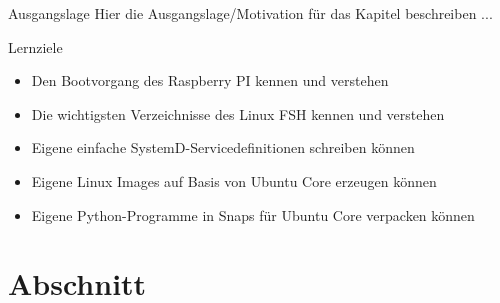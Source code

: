 \begin{frame}{Ausgangslage}
    Hier die Ausgangslage/Motivation für das Kapitel beschreiben ...

\end{frame}

\begin{frame}{Lernziele}
    \begin{itemize}
        \item Den Bootvorgang des Raspberry PI kennen und verstehen
        \item Die wichtigsten Verzeichnisse des Linux FSH kennen und verstehen
        \item Eigene einfache SystemD-Servicedefinitionen schreiben können
        \item Eigene Linux Images auf Basis von Ubuntu Core erzeugen können
        \item Eigene Python-Programme in Snaps für Ubuntu Core verpacken können
    \end{itemize}
\end{frame}


\section{Abschnitt}

